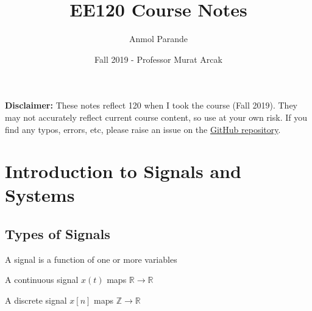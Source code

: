 

\title{EE120 Course Notes}
\author{Anmol Parande}
\date{Fall 2019 - Professor Murat Arcak}
\maketitle
\textbf{Disclaimer: }These notes reflect 120 when I took the course (Fall 2019). They may not accurately reflect current course content, so use at your own risk.
If you find any typos, errors, etc, please raise an issue on the \href{https://github.com/parandea17/BerkeleyNotes}{GitHub repository}.\\
\tableofcontents
\newpage
\section{Introduction to Signals and Systems}
\subsection{Types of Signals}
\begin{definition}
    A signal is a function of one or more variables
\end{definition}
\begin{definition}
    A continuous signal $x(t)$ maps $\mathbb{R} \rightarrow \mathbb{R}$
\end{definition}
\begin{definition}
    A discrete signal $x[n]$ maps $\mathbb{Z} \rightarrow \mathbb{R}$
\end{definition}
